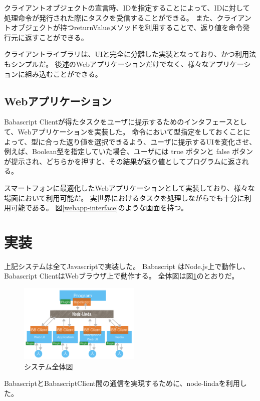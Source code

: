クライアントオブジェクトの宣言時、IDを指定することによって、IDに対して処理命令が発行された際にタスクを受信することができる。
また、クライアントオブジェクトが持つreturnValueメソッドを利用することで、返り値を命令発行元に返すことができる。

クライアントライブラリは、UIと完全に分離した実装となっており、かつ利用法もシンプルだ。
後述のWebアプリケーションだけでなく、様々なアプリケーションに組み込むことができる。

\subsection{Webアプリケーション}\label{webux30a2ux30d7ux30eaux30b1ux30fcux30b7ux30e7ux30f3}

Babascript
Clientが得たタスクをユーザに提示するためのインタフェースとして、Webアプリケーションを実装した。
命令において型指定をしておくことによって、型に合った返り値を選択できるよう、ユーザに提示するUIを変化させ、
例えば、Boolean型を指定していた場合、ユーザには true ボタンと false
ボタンが提示され、どちらかを押すと、その結果が返り値としてプログラムに返される。

スマートフォンに最適化したWebアプリケーションとして実装しており、様々な場面において利用可能だ。
実世界におけるタスクを処理しながらでも十分に利用可能である。
図\ref{webapp-interface}のような画面を持つ。

\section{実装}\label{ux5b9fux88c5}

上記システムは全てJavascriptで実装した。 Babascript
はNode.js上で動作し、Babascript ClientはWebブラウザ上で動作する。
全体図は図\ref{system}のとおりだ。

\begin{figure}[h]
  \includegraphics[width=220px]{./images/system.png}
  \caption{システム全体図}  
  \label{system}
\end{figure}

BabascriptとBabascriptClient間の通信を実現するために、node-linda\cite{linda}を利用した。

